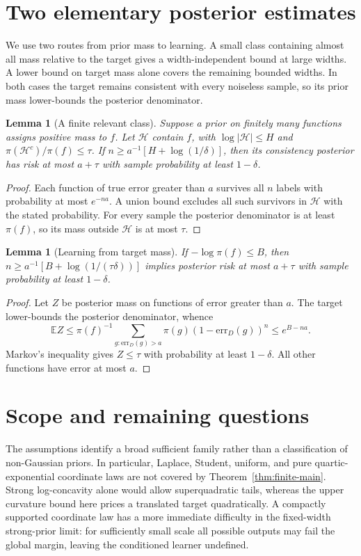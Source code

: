 \documentclass[11pt]{article}
\newtheorem{lemma}[theorem]{Lemma}\newtheorem{corollary}[theorem]{Corollary}
\theoremstyle{remark}\newtheorem{remark}[theorem]{Remark}
\newcommand{\E}{\mathbb E}\newcommand{\Prb}{\mathbb P}\renewcommand{\Pr}{\mathbb P}\newcommand{\R}{\mathbb R}
\begin{document}
\section{Two elementary posterior estimates}\label{sec:posterior}
We use two routes from prior mass to learning. A small class containing
almost all mass relative to the target gives a width-independent bound
at large widths. A lower bound on target mass alone covers the remaining
bounded widths. In both cases the target remains consistent with every
noiseless sample, so its prior mass lower-bounds the posterior denominator.
\begin{lemma}[A finite relevant class]\label{lem:finite-posterior}
Suppose a prior on finitely many functions assigns positive mass to $f$.
Let $\mathcal H$ contain $f$, with $\log|\mathcal H|\leq H$ and
$\pi(\mathcal H^c)/\pi(f)\leq\tau$. If
$n\geq a^{-1}[H+\log(1/\delta)]$, then its consistency posterior has
risk at most $a+\tau$ with sample probability at least $1-\delta$.
\end{lemma}
\begin{proof}
Each function of true error greater than $a$ survives all $n$ labels with
probability at most $e^{-na}$. A union bound excludes all such survivors
in $\mathcal H$ with the stated probability. For every sample the
posterior denominator is at least $\pi(f)$, so its mass outside
$\mathcal H$ is at most $\tau$.
\end{proof}

\begin{lemma}[Learning from target mass]\label{lem:target-posterior}
If $-\log\pi(f)\leq B$, then
$n\geq a^{-1}[B+\log(1/(\tau\delta))]$ implies posterior risk at most
$a+\tau$ with sample probability at least $1-\delta$.
\end{lemma}
\begin{proof}
Let $Z$ be posterior mass on functions of error greater than $a$. The
target lower-bounds the posterior denominator, whence
\[
 \E Z\leq\pi(f)^{-1}\sum_{g:\mathrm{err}_D(g)>a}
       \pi(g)(1-\mathrm{err}_D(g))^n\leq e^{B-na}.
\]
Markov's inequality gives $Z\leq\tau$ with probability at least
$1-\delta$. All other functions have error at most $a$.
\end{proof}







\section{Scope and remaining questions}
The assumptions identify a broad sufficient family rather than a
classification of non-Gaussian priors. In particular, Laplace, Student,
uniform, and pure quartic-exponential coordinate laws are not covered by
Theorem~\ref{thm:finite-main}. Strong log-concavity alone would allow
superquadratic tails, whereas the upper curvature bound here prices a
translated target quadratically. A compactly supported coordinate law has
a more immediate difficulty in the fixed-width strong-prior limit: for
sufficiently small scale all possible outputs may fail the global margin,
leaving the conditioned learner undefined.
\end{document}
